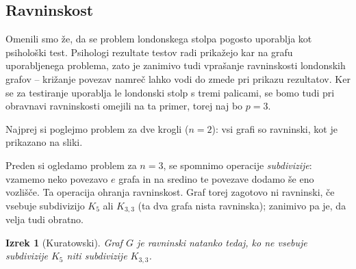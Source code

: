 \documentclass[11pt,a4paper]{article}
\theoremstyle{definition} %
\theoremstyle{plain} %
\newtheorem{izrek}[definicija]{Izrek}
\begin{document}
\subsection{Ravninskost}

Omenili smo že, da se problem londonskega stolpa pogosto uporablja kot psihološki test. Psihologi rezultate testov radi prikažejo kar na grafu uporabljenega problema, zato je zanimivo tudi vprašanje ravninskosti londonskih grafov -- križanje povezav namreč lahko vodi do zmede pri prikazu rezultatov. Ker se za testiranje uporablja le londonski stolp s tremi palicami, se bomo tudi pri obravnavi ravninskosti omejili na ta primer, torej naj bo $p=3$.

Najprej si poglejmo problem za dve krogli ($n=2$): vsi grafi so ravninski, kot je prikazano na sliki.

Preden si ogledamo problem za $n=3$, se spomnimo operacije \emph{subdivizije}: vzamemo neko povezavo $e$ grafa in na sredino te povezave dodamo še eno vozlišče. Ta operacija ohranja ravninskost.   
Graf torej zagotovo ni ravninski, če vsebuje subdivizijo $K_5$ ali $K_{3,3}$ (ta dva grafa nista ravninska); zanimivo pa je, da velja tudi obratno.

\medskip

\begin{izrek}[Kuratowski]
    Graf $G$ je ravninski natanko tedaj, ko ne vsebuje subdivizije $K_5$ niti subdivizije $K_{3,3}$.
\end{izrek}

\medskip
\end{document}

